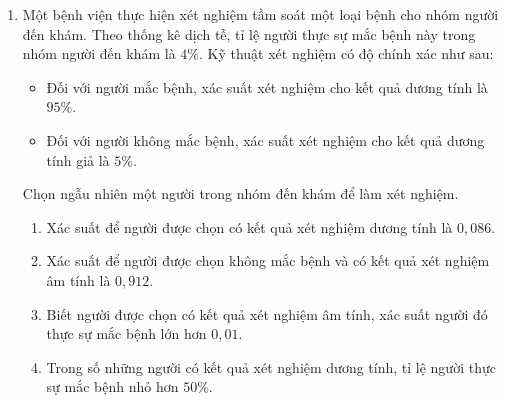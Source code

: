 \documentclass[12pt,a4paper]{article}
\begin{document}
\begin{enumerate}
\item Một bệnh viện thực hiện xét nghiệm tầm soát một loại bệnh cho nhóm người đến khám. Theo thống kê dịch tễ, tỉ lệ người thực sự mắc bệnh này trong nhóm người đến khám là $4\%$. Kỹ thuật xét nghiệm có độ chính xác như sau:
\begin{itemize}[leftmargin=*,itemsep=2pt,topsep=2pt]
\item Đối với người mắc bệnh, xác suất xét nghiệm cho kết quả dương tính là $95\%$.
\item Đối với người không mắc bệnh, xác suất xét nghiệm cho kết quả dương tính giả là $5\%$.
\end{itemize}
Chọn ngẫu nhiên một người trong nhóm đến khám để làm xét nghiệm.
\begin{enumerate}
\item Xác suất để người được chọn có kết quả xét nghiệm dương tính là $0{,}086$.
\item Xác suất để người được chọn không mắc bệnh và có kết quả xét nghiệm âm tính là $0{,}912$.
\item Biết người được chọn có kết quả xét nghiệm âm tính, xác suất người đó thực sự mắc bệnh lớn hơn $0{,}01$.
\item Trong số những người có kết quả xét nghiệm dương tính, tỉ lệ người thực sự mắc bệnh nhỏ hơn $50\%$.
\end{enumerate}


\end{enumerate}
\end{document}
